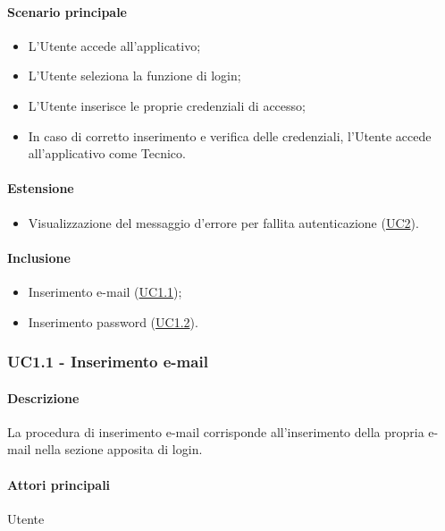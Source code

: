 \paragraph*{Scenario principale}
\begin{itemize}
  \item L’Utente accede all’applicativo;
  \item L’Utente seleziona la funzione di login;
  \item L’Utente inserisce le proprie credenziali di accesso;
  \item In caso di corretto inserimento e verifica delle credenziali, l’Utente accede all’applicativo come Tecnico.
\end{itemize}

\paragraph*{Estensione}
\begin{itemize}
  \item Visualizzazione del messaggio d’errore per fallita autenticazione (\hyperref[UC2]{UC2}).
\end{itemize}

\paragraph*{Inclusione}
\begin{itemize}
  \item Inserimento e-mail (\hyperref[UC1point1]{UC1.1});
  \item Inserimento password (\hyperref[UC1point2]{UC1.2}).
\end{itemize}


\subsubsection{UC1.1 - Inserimento e-mail}\label{UC1point1}

\paragraph*{Descrizione}
La procedura di inserimento e-mail corrisponde all’inserimento della propria e-mail nella sezione apposita di login.

\paragraph*{Attori principali}
Utente

